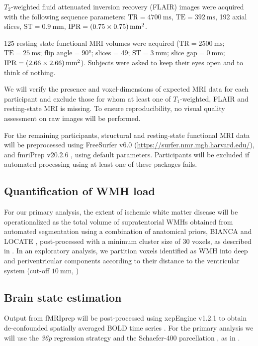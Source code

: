 $T_2$-weighted fluid attenuated inversion recovery (FLAIR) images were acquired with the following sequence parameters: $\text{TR} = \qty{4700}{\ms}$, $\text{TE} = \qty{392}{\ms}$, \num{192} axial slices, $\text{ST} = \qty{0.9}{\mm}$, $\text{IPR} = \qtyproduct[product-units = bracket-power]{0.75 x 0.75}{\mm}$.

\num{125} resting state functional MRI volumes were acquired ($\text{TR} = \qty{2500}{\ms}$; $\text{TE} = \qty{25}{\ms}$; $\text{flip angle} = \ang[]{90}$; slices = \num{49}; $\text{ST} = \qty{3}{\mm}$; $\text{slice gap} = \qty{0}{\mm}$; $\text{IPR} = \qtyproduct[product-units = bracket-power]{2.66 x 2.66}{\mm}$).
Subjects were asked to keep their eyes open and to think of nothing.

We will verify the presence and voxel-dimensions of expected MRI data for each participant and exclude those for whom at least one of $T_1$-weighted, FLAIR and resting-state MRI is missing.
To ensure reproducibility, no visual quality assessment on raw images will be performed.

For the remaining participants, structural and resting-state functional MRI data will be preprocessed using FreeSurfer v6.0 (\url{https://surfer.nmr.mgh.harvard.edu/}), and fmriPrep v20.2.6 \citep{Esteban2019-sx}, using default parameters. Participants will be excluded if automated processing using at least one of these packages fails.

\subsection{Quantification of WMH load}
For our primary analysis, the extent of ischemic white matter disease will be operationalized as the total volume of supratentorial WMHs obtained from automated segmentation using a combination of anatomical priors, BIANCA \citep{Griffanti2016-dt} and LOCATE \citep{Sundaresan2019-ww}, post-processed with a minimum cluster size of \num{30} voxels, as described in \citep{Schlemm2022-he}.
In an exploratory analysis, we partition voxels identified as WMH into deep and periventricular components according to their distance to the ventricular system (cut-off $\qty{10}{\mm}$, \citep{Griffanti2018-oa})

\subsection{Brain state estimation}
Output from fMRIprep will be post-processed using xcpEngine v1.2.1 to obtain de-confounded spatially averaged BOLD time series \citep{Ciric2017-cl}.
For the primary analysis we will use the \textit{36p} regression strategy and the Schaefer-\num{400} parcellation \citep{Schaefer2018-bo}, as in \citep{Schlemm2022-he}.
 

